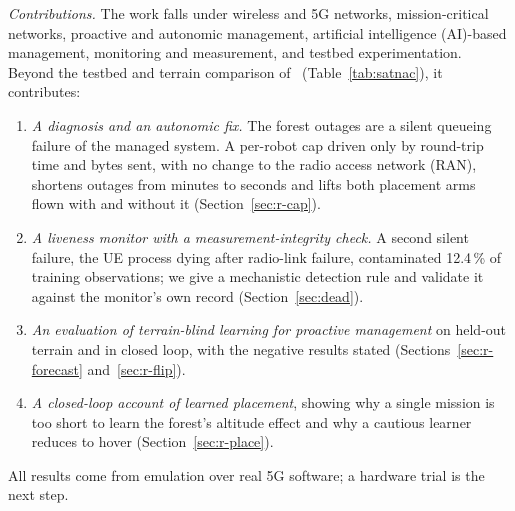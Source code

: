 \textit{Contributions.} The work falls under wireless and 5G networks,
mission-critical networks, proactive and autonomic management, artificial
intelligence (AI)-based management, monitoring and measurement, and testbed
experimentation. Beyond the testbed and terrain comparison
of~\cite{makhubela2026satnac} (Table~\ref{tab:satnac}), it contributes:
\begin{enumerate}
\item \emph{A diagnosis and an autonomic fix.} The forest outages are a silent
queueing failure of the managed system. A per-robot cap driven only by
round-trip time and bytes sent, with no change to the radio access network
(RAN), shortens outages from minutes to seconds and lifts both placement arms
flown with and without it (Section~\ref{sec:r-cap}).
\item \emph{A liveness monitor with a measurement-integrity check.} A second
silent failure, the UE process dying after radio-link failure, contaminated
12.4\,\% of training observations; we give a mechanistic detection rule and
validate it against the monitor's own record (Section~\ref{sec:dead}).
\item \emph{An evaluation of terrain-blind learning for proactive management}
on held-out terrain and in closed loop, with the negative results stated
(Sections~\ref{sec:r-forecast} and~\ref{sec:r-flip}).
\item \emph{A closed-loop account of learned placement}, showing why a single
mission is too short to learn the forest's altitude effect and why a cautious
learner reduces to hover (Section~\ref{sec:r-place}).
\end{enumerate}
All results come from emulation over real 5G software; a hardware trial is the
next step.
